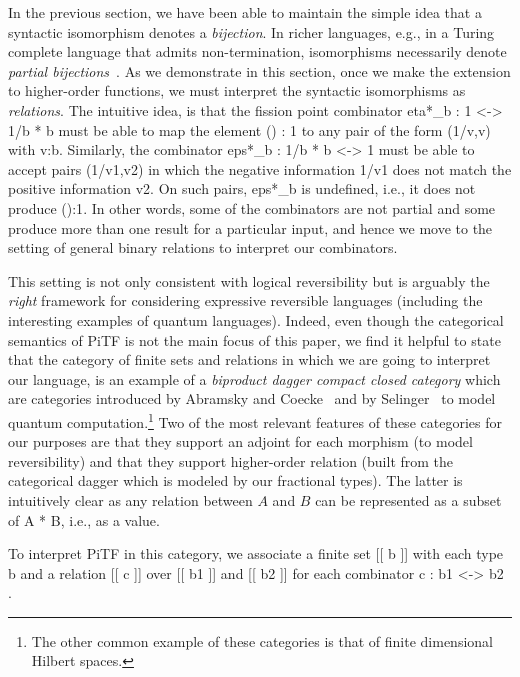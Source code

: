 \documentclass{llncs}
\begin{document}
In the previous section, we have been able to maintain the simple idea that a
syntactic isomorphism denotes a \emph{bijection}. In richer languages, e.g.,
in a Turing complete language that admits non-termination, isomorphisms
necessarily denote \emph{partial
  bijections}~\cite{rc2011,James:2012:IE:2103656.2103667}. As we demonstrate
in this section, once we make the extension to higher-order functions, we
must interpret the syntactic isomorphisms as \emph{relations}. The intuitive
idea, is that the fission point combinator {{eta*_b : 1 <-> 1/b * b}} must be
able to map the element {{() : 1}} to any pair of the form {{(1/v,v)}} with
{{v:b}}. Similarly, the combinator {{eps*_b : 1/b * b <-> 1}} must be able to
accept pairs {{(1/v1,v2)}} in which the negative information {{1/v1}} does
not match the positive information {{v2}}. On such pairs, {{eps*_b}} is
undefined, i.e., it does not produce {{():1}}. In other words, some of the
combinators are not partial and some produce more than one result for a
particular input, and hence we move to the setting of general binary
relations to interpret our combinators.

This setting is not only consistent with logical reversibility but is
arguably the \emph{right} framework for considering expressive reversible
languages (including the interesting examples of quantum languages).  Indeed,
even though the categorical semantics of {{PiTF}} is not the main focus
of this paper, we find it helpful to state that the category of finite sets
and relations in which we are going to interpret our language, is an example
of a \emph{biproduct dagger compact closed category} which are categories
introduced by Abramsky and Coecke~\cite{Abramsky:2004:CSQ:1018438.1021878}
and by Selinger~\cite{Selinger:2007:DCC:1229185.1229207} to model quantum
computation.\footnote{The other common example of these categories is that of
  finite dimensional Hilbert spaces.} Two of the most relevant features of
these categories for our purposes are that they support an adjoint for each
morphism (to model reversibility) and that they support higher-order relation
(built from the categorical dagger which is modeled by our fractional
types). The latter is intuitively clear as any relation between $A$ and $B$
can be represented as a subset of {{A * B}}, i.e., as a value.

To interpret {{PiTF}} in this category, we associate a finite set
{{ [[ b ]] }} with each type {{b}} and a relation {{ [[ c ]] }} over
{{ [[ b1 ]] }} and {{ [[ b2 ]] }} for each combinator {{ c : b1 <-> b2 }}.
\end{document}
